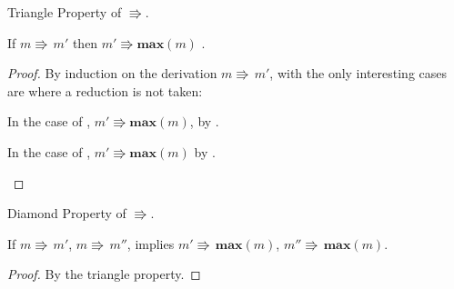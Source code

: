  
\begin{lem} Triangle Property of $\Rrightarrow$.
 
If $m\Rrightarrow\,m'$ then $m'\Rrightarrow \textbf{max}\left(m\right)$ .
\end{lem}
\begin{proof}
By induction on the derivation $m\Rrightarrow\,m'$, with the only interesting cases are where a reduction is not taken:
\begin{casenv}
\item In the case of , $m'\Rrightarrow \textbf{max}\left(m\right)$, by .
\item In the case of , $m'\Rrightarrow \textbf{max}\left(m\right)$ by .
\end{casenv}
\end{proof}

\begin{lem} Diamond Property of $\Rrightarrow$.
 
If $m\Rrightarrow\,m'$, $m\Rrightarrow\,m''$, implies $m'\Rrightarrow\,\textbf{max}\left(m\right)$, $m''\Rrightarrow\,\textbf{max}\left(m\right)$.
\end{lem}
\begin{proof}
By the triangle property.
\end{proof}

